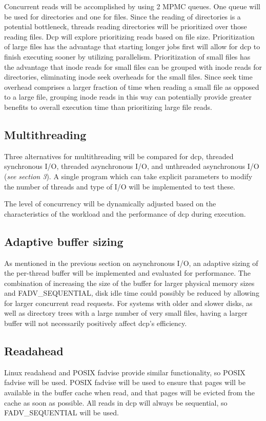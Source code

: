 \documentclass[12pt]{article}
\begin{document}
Concurrent reads will be accomplished by using 2 MPMC queues.
One queue will be used for directories and one for files.
Since the reading of directories is a potential bottleneck, threads
reading directories will be prioritized over those reading files.
Dcp will explore prioritizing reads based on file size.
Prioritization of large files has the advantage that starting
longer jobs first will allow for dcp to finish executing sooner
by utilizing parallelism.
Prioritization of small files has the advantage that
inode reads for small files can be grouped with inode reads for
directories, eliminating inode seek overheads for the small files.
Since seek time overhead comprises a larger fraction of time when
reading a small file as opposed to a large file, grouping inode
reads in this way can potentially provide greater benefits to
overall execution time than prioritizing large file reads.

\subsection{Multithreading}
Three alternatives for multithreading will be compared for dcp,
threaded synchronous I/O, threaded asynchronous I/O, and unthreaded
asynchronous I/O (\textit{see section 3}). A single program which
can take explicit parameters to modify the number of threads and
type of I/O will be implemented to test these.

The level of concurrency will be dynamically adjusted based
on the characteristics of the workload and the performance
of dcp during execution.

\subsection{Adaptive buffer sizing}
As mentioned in the previous section on asynchronous I/O, an adaptive
sizing of the per-thread buffer will be implemented and evaluated for
performance. The combination of increasing the size of the buffer for
larger physical memory sizes and FADV\_SEQUENTIAL, disk idle time could
possibly be reduced by allowing for larger concurrent read requests.
For systems with older and slower disks, as well as directory trees
with a large number of very small files, having a larger buffer
will not necessarily positively affect dcp's efficiency.

\subsection{Readahead}
Linux readahead and POSIX fadvise provide similar functionality,
so POSIX fadvise will be used.
POSIX fadvise will be used to ensure that pages will be available
in the buffer cache when read, and that pages will be evicted from
the cache as soon as possible. All reads in dcp will
always be sequential, so FADV\_SEQUENTIAL will be used.
\end{document}
